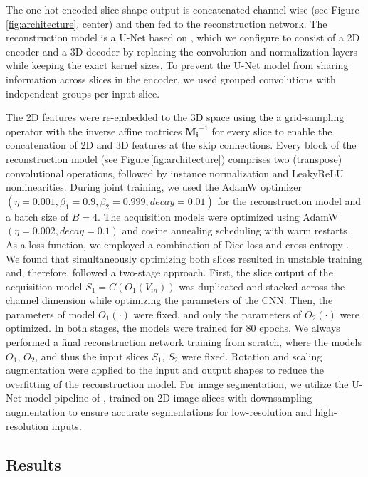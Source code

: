     The one-hot encoded slice shape output is concatenated channel-wise (see Figure\,\ref{fig:architecture}, center)
    and then fed to the reconstruction network.
    The reconstruction model is a U-Net based on \citep{isensee2021nnu}, which we configure to consist of a 2D encoder and a 3D decoder by replacing the convolution and normalization layers while keeping the exact kernel sizes.
    To prevent the U-Net model from sharing information across slices in the encoder, we used grouped convolutions with independent groups per input slice.

    The 2D features were re-embedded to the 3D space using the a grid-sampling operator with the inverse affine matrices $\mathbf{M_i}^{-1}$ for every slice to enable the concatenation of 2D and 3D features at the skip connections.
    Every block of the reconstruction model (see Figure\,\ref{fig:architecture}) comprises two (transpose) convolutional operations, followed by instance normalization and LeakyReLU nonlinearities.
    During joint training, we used the AdamW optimizer \citep{loshchilov2017decoupled} $(\eta=0.001, \beta_1=0.9, \beta_2=0.999, decay=0.01)$ for the reconstruction model and a batch size of $B=4$.
    The acquisition models were optimized using AdamW $(\eta=0.002, decay=0.1)$ and cosine annealing scheduling with warm restarts \citep{loshchilov2016sgdr}.
    As a loss function, we employed a combination of Dice loss and cross-entropy \citep{isensee2021nnu}.
    We found that simultaneously optimizing both slices resulted in unstable training and, therefore, followed a two-stage approach. First, the slice output of the acquisition model $S_1 = C(O_1(V_{in}))$ was duplicated and stacked across the channel dimension while optimizing the parameters of the CNN. Then, the parameters of model $O_1(\cdot)$ were fixed, and only the parameters of $O_2(\cdot)$ were optimized. In both stages, the models were trained for 80 epochs.
    We always performed a final reconstruction network training from scratch, where the models $O_1$, $O_2$, and thus the input slices $S_1$, $S_2$ were fixed.
    Rotation and scaling augmentation were applied to the input and output shapes to reduce the overfitting of the reconstruction model.
    For image segmentation, we utilize the U-Net model pipeline of \citep{isensee2021nnu}, trained on 2D image slices with downsampling augmentation to ensure accurate segmentations for low-resolution and high-resolution inputs.

    \subsection{Results}
